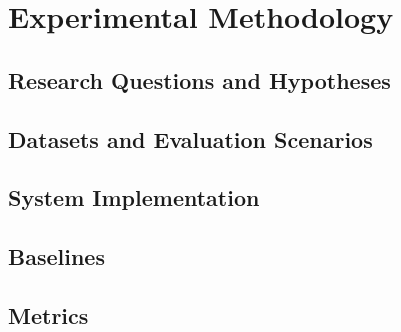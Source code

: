 \section{Experimental Methodology}

\subsection{Research Questions and Hypotheses}
\label{subsec:research_questions}

\subsection{Datasets and Evaluation Scenarios}
\label{subsec:datasets}

\subsection{System Implementation}
\label{subsec:system_impl}

\subsection{Baselines}
\label{subsec:baselines}

\subsection{Metrics}
\label{subsec:metrics}

